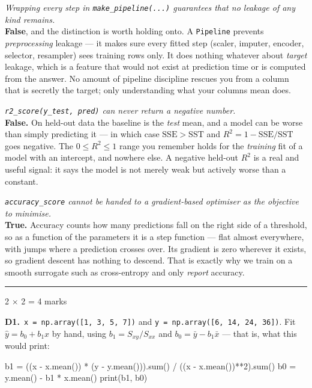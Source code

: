 \documentclass[10pt,a4paper]{article}
\newcommand{\parthead}[2]{\vspace{2pt}\noindent\rule{\linewidth}{0.4pt}\par\vspace{2pt}%
  \noindent{\bfseries Part #1}\hfill{\small #2}\par\vspace{1pt}}
\begin{document}
\begin{sC}

  \item \emph{Wrapping every step in \texttt{make\_pipeline(...)} guarantees that no leakage of any kind remains.}\\[2pt] \textbf{False}, and the distinction is worth holding onto. A \texttt{Pipeline} prevents \emph{preprocessing} leakage --- it makes sure every fitted step (scaler, imputer, encoder, selector, resampler) sees training rows only. It does nothing whatever about \emph{target} leakage, which is a feature that would not exist at prediction time or is computed from the answer. No amount of pipeline discipline rescues you from a column that is secretly the target; only understanding what your columns mean does.

  \item \emph{\texttt{r2\_score(y\_test, pred)} can never return a negative number.}\\[2pt] \textbf{False.} On held-out data the baseline is the \emph{test} mean, and a model can be worse than simply predicting it --- in which case $\mathrm{SSE} > \mathrm{SST}$ and $R^2 = 1 - \mathrm{SSE}/\mathrm{SST}$ goes negative. The $0 \le R^2 \le 1$ range you remember holds for the \emph{training} fit of a model with an intercept, and nowhere else. A negative held-out $R^2$ is a real and useful signal: it says the model is not merely weak but actively worse than a constant.

  \item \emph{\texttt{accuracy\_score} cannot be handed to a gradient-based optimiser as the objective to minimise.}\\[2pt] \textbf{True.} Accuracy counts how many predictions fall on the right side of a threshold, so as a function of the parameters it is a step function --- flat almost everywhere, with jumps where a prediction crosses over. Its gradient is zero wherever it exists, so gradient descent has nothing to descend. That is exactly why we train on a smooth surrogate such as cross-entropy and only \emph{report} accuracy.

\end{sC}

\newpage

\parthead{D --- Short answer}{2 $\times$ 2 = 4 marks}

\textbf{D1.}\ \texttt{x = np.array([1, 3, 5, 7])} and \texttt{y = np.array([6, 14, 24, 36])}. Fit $\hat y = b_0 + b_1x$ by hand, using $b_1 = S_{xy}/S_{xx}$ and $b_0 = \bar y - b_1\bar x$ --- that is, what this would print:
\begin{code}
b1 = ((x - x.mean()) * (y - y.mean())).sum() / ((x - x.mean())**2).sum()
b0 = y.mean() - b1 * x.mean()
print(b1, b0)
\end{code}
\end{document}
